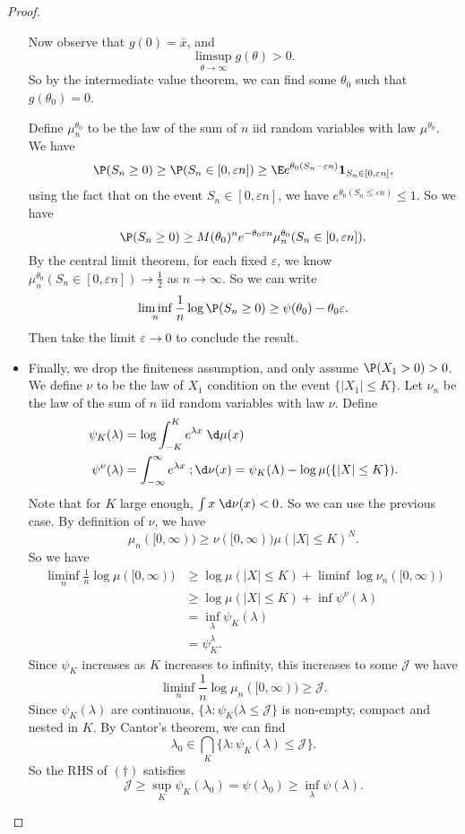 \documentclass[a4paper]{article}
\begin{document}
\begin{proof}
\begin{itemize}
      Now observe that $g(0) = \bar{x}$, and
      \[
        \limsup_{\theta \to \infty} g(\theta) > 0.
      \]
      So by the intermediate value theorem, we can find some $\theta_0$ such that $g(\theta_0) = 0$.

      Define $\mu^{\theta_0}_n$ to be the law of the sum of $n$ iid random variables with law $\mu^{\theta_0}$. We have
      \[
        \P(S_n \geq 0) \geq \P(S_n \in [0, \varepsilon n])  \geq \E e^{\theta_0(S_n - \varepsilon n)} \mathbf{1}_{S_n \in [0, \varepsilon n]},
      \]
      using the fact that on the event $S_n \in [0, \varepsilon n]$, we have $e^{\theta_0 (S_n \leq \varepsilon n)} \leq 1$. So we have
      \[
        \P(S_n \geq 0) \geq M(\theta_0)^n e^{-\theta_0 \varepsilon n} \mu_n^{\theta_0} (S_n \in [0, \varepsilon n]).
      \]
      By the central limit theorem, for each fixed $\varepsilon$, we know $\mu_n^{\theta_0} (S_n \in [0, \varepsilon n]) \to \frac{1}{2}$ as $n \to \infty$. So we can write
      \[
        \liminf_n \frac{1}{n} \log \P(S_n \geq 0) \geq \psi(\theta_0) - \theta_0 \varepsilon.
      \]
      Then take the limit $\varepsilon \to 0$ to conclude the result.
    \item Finally, we drop the finiteness assumption, and only assume $\P(X_1 > 0) > 0$. We define $\nu$ to be the law of $X_1$ condition on the event $\{|X_1| \leq K\}$. Let $\nu_n$ be the law of the sum of $n$ iid random variables with law $\nu$. Define
      \begin{align*}
        \psi_K(\lambda) &= \log \int_{-K}^K e^{\lambda x} \;\d \mu(x)\\
        \psi^\nu(\lambda) &= \int_{-\infty}^\infty e^{\lambda x} \;;\d \nu(x) = \psi_K(\Lambda) - \log \mu (\{|X| \leq K\}).
      \end{align*}
      Note that for $K$ large enough, $\int x \;\d \nu(x) < 0$. So we can use the previous case. By definition of $\nu$, we have
      \[
        \mu_n([0, \infty)) \geq \nu([0, \infty)) \mu(|X| \leq K)^N.
      \]
      So we have
      \begin{align*}
        \liminf_n \frac{1}{n} \log \mu([0, \infty)) &\geq \log \mu(|X| \leq K) + \liminf \log \nu_n([0, \infty))\\
        &\geq \log \mu(|X| \leq K) + \inf \psi^\nu (\lambda)\\
        &= \inf_\lambda \psi_K(\lambda)\\
        &= \psi_K^\lambda.
      \end{align*}
      Since $\psi_K$ increases as $K$ increases to infinity, this increases to some $\mathcal{J}$ we have
      \[
        \liminf_n \frac{1}{n} \log \mu_n([0, \infty)) \geq \mathcal{J}.\tag{$\dagger$}
      \]
      Since $\psi_K(\lambda)$ are continuous, $\{\lambda: \psi_K (\lambda \leq \mathcal{J}\}$ is non-empty, compact and nested in $K$. By Cantor's theorem, we can find
      \[
        \lambda_0 \in \bigcap_K \{\lambda: \psi_K(\lambda) \leq \mathcal{J}\}.
      \]
      So the RHS of $(\dagger)$ satisfies
      \[
        \mathcal{J} \geq \sup_K \psi_K(\lambda _0) = \psi(\lambda_0) \geq \inf_\lambda \psi(\lambda).
      \]
  \end{itemize}
\end{proof}
\printindex
\end{document}
